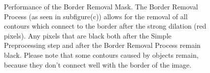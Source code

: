 \documentclass[11pt]{article}
\begin{document}
	\begin{figure}[htp]
		\centering
		\quad
		
		\quad
		
		\caption{Performance of the Border Removal Mask.
		The Border Removal Process (as seen in subfigure(c)) allows for the removal of all contours which connect to the border after the strong dilation (red pixels).
		Any pixels that are black both after the Simple Preprocessing step and after the Border Removal Process remain black.		
		Please note that some contours caused by objects remain, because they don't connect well with the border of the image.}
		\label{fig:BorderRemoval}
	\end{figure}
	
\end{document}
